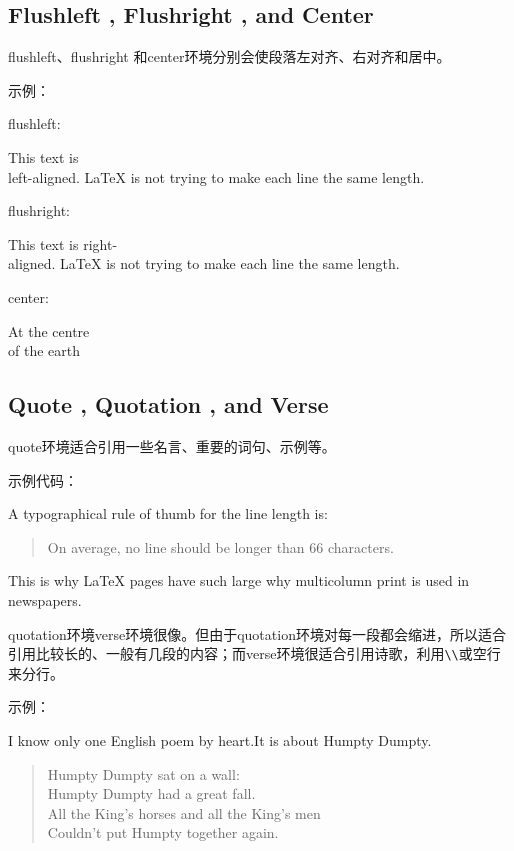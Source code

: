 \documentclass[UTF8]{ctexart}
\begin{document}
\subsection{Flushleft , Flushright , and Center}
\qquad flushleft、flushright 和center环境分别会使段落左对齐、右对齐和居中。

示例：

flushleft:

\begin{flushleft}
This text is\\left-aligned.
\LaTeX{} is not trying to make each line the same length.
\end{flushleft}

flushright:

\begin{flushright}
This text is right-\\aligned.
\LaTeX{} is not trying to make each line the same length.
\end{flushright}

center:

\begin{center}
At the centre\\of the earth
\end{center}

\subsection{Quote , Quotation , and Verse}
\qquad quote环境适合引用一些名言、重要的词句、示例等。

示例代码：

A typographical rule of thumb for the line length is:
\begin{quote}
On average, no line should be longer than 66 characters.
\end{quote}
This is why \LaTeX{} pages have such large why multicolumn print is used in newspapers.

\qquad quotation环境verse环境很像。但由于quotation环境对每一段都会缩进，所以适合引用比较长的、一般有几段的内容；而verse环境很适合引用诗歌，利用\texttt{\textbackslash}\texttt{\textbackslash}或空行来分行。

示例：

I know only one English poem by heart.It is about Humpty Dumpty.
\begin{flushleft}
\begin{verse}
Humpty Dumpty sat on a wall:\\
Humpty Dumpty had a great fall.\\
All the King's horses and all the King's men\\
Couldn't put Humpty together again.
\end{verse}
\end{flushleft}
\end{document}
